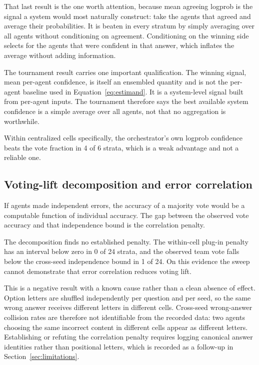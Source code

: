 That last result is the one worth attention, because mean agreeing logprob is the signal a
system would most naturally construct: take the agents that agreed and average their
probabilities. It is beaten in every stratum by simply averaging over all agents without
conditioning on agreement. Conditioning on the winning side selects for the agents that
were confident in that answer, which inflates the average without adding information.

The tournament result carries one important qualification. The winning signal, mean
per-agent confidence, is itself an ensembled quantity and is not the per-agent baseline
used in Equation~\ref{eq:estimand}. It is a system-level signal built from per-agent
inputs. The tournament therefore says the best available system confidence is a simple
average over all agents, not that no aggregation is worthwhile.

Within centralized cells specifically, the orchestrator's own logprob confidence beats the
vote fraction in 4 of 6 strata, which is a weak advantage and not a reliable one.

\subsection{Voting-lift decomposition and error correlation}

If agents made independent errors, the accuracy of a majority vote would be a computable
function of individual accuracy. The gap between the observed vote accuracy and that
independence bound is the correlation penalty.

The decomposition finds no established penalty. The within-cell plug-in penalty has an
interval below zero in 0 of 24 strata, and the observed team vote falls below the
cross-seed independence bound in 1 of 24. On this evidence the sweep cannot demonstrate
that error correlation reduces voting lift.

This is a negative result with a known cause rather than a clean absence of effect. Option
letters are shuffled independently per question and per seed, so the same wrong answer
receives different letters in different cells. Cross-seed wrong-answer collision rates are
therefore not identifiable from the recorded data: two agents choosing the same incorrect
content in different cells appear as different letters. Establishing or refuting the
correlation penalty requires logging canonical answer identities rather than positional
letters, which is recorded as a follow-up in Section~\ref{sec:limitations}.

